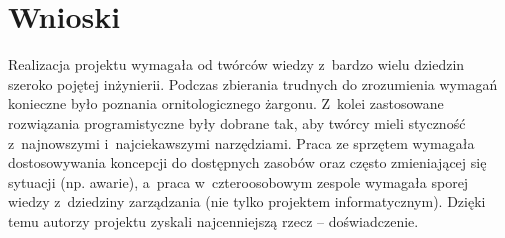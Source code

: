 \section{Wnioski}
Realizacja projektu wymagała od twórców wiedzy z~bardzo wielu dziedzin szeroko
pojętej inżynierii. Podczas zbierania trudnych do zrozumienia wymagań konieczne
było poznania ornitologicznego żargonu. Z~kolei zastosowane rozwiązania
programistyczne były dobrane tak, aby twórcy mieli styczność z~najnowszymi
i~najciekawszymi narzędziami. Praca ze sprzętem wymagała dostosowywania
koncepcji do dostępnych zasobów oraz często zmieniającej się sytuacji (np.
awarie), a~praca w~czteroosobowym zespole wymagała sporej wiedzy z~dziedziny
zarządzania (nie tylko projektem informatycznym). Dzięki temu autorzy projektu
zyskali najcenniejszą rzecz -- doświadczenie.  

